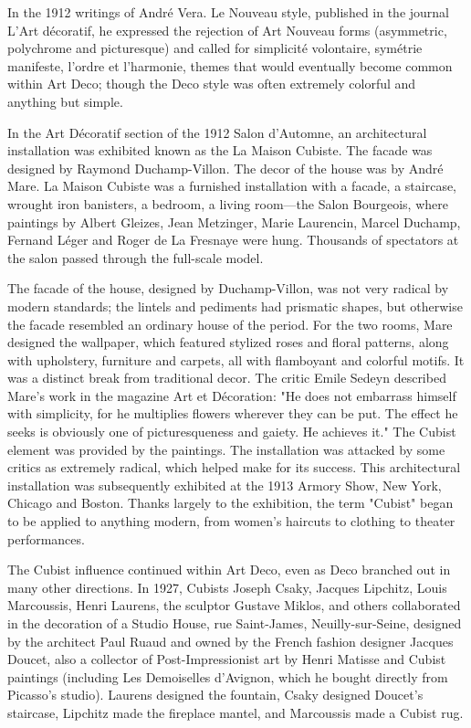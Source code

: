 In the 1912 writings of André Vera. Le Nouveau style, published in the
journal L'Art décoratif, he expressed the rejection of Art Nouveau forms
(asymmetric, polychrome and picturesque) and called for simplicité
volontaire, symétrie manifeste, l'ordre et l'harmonie, themes that would
eventually become common within Art Deco; though the Deco style was
often extremely colorful and anything but simple.

In the Art Décoratif section of the 1912 Salon d'Automne, an
architectural installation was exhibited known as the La Maison Cubiste.
The facade was designed by Raymond Duchamp-Villon. The decor of the
house was by André Mare. La Maison Cubiste was a furnished installation
with a facade, a staircase, wrought iron banisters, a bedroom, a living
room---the Salon Bourgeois, where paintings by Albert Gleizes, Jean
Metzinger, Marie Laurencin, Marcel Duchamp, Fernand Léger and Roger de
La Fresnaye were hung. Thousands of spectators at the salon passed
through the full-scale model.

The facade of the house, designed by Duchamp-Villon, was not very
radical by modern standards; the lintels and pediments had prismatic
shapes, but otherwise the facade resembled an ordinary house of the
period. For the two rooms, Mare designed the wallpaper, which featured
stylized roses and floral patterns, along with upholstery, furniture and
carpets, all with flamboyant and colorful motifs. It was a distinct
break from traditional decor. The critic Emile Sedeyn described Mare's
work in the magazine Art et Décoration: "He does not embarrass himself
with simplicity, for he multiplies flowers wherever they can be put. The
effect he seeks is obviously one of picturesqueness and gaiety. He
achieves it." The Cubist element was provided by the paintings. The
installation was attacked by some critics as extremely radical, which
helped make for its success. This architectural installation was
subsequently exhibited at the 1913 Armory Show, New York, Chicago and
Boston. Thanks largely to the exhibition, the term "Cubist" began to be
applied to anything modern, from women's haircuts to clothing to theater
performances.

The Cubist influence continued within Art Deco, even as Deco branched
out in many other directions. In 1927, Cubists Joseph Csaky, Jacques
Lipchitz, Louis Marcoussis, Henri Laurens, the sculptor Gustave Miklos,
and others collaborated in the decoration of a Studio House, rue
Saint-James, Neuilly-sur-Seine, designed by the architect Paul Ruaud and
owned by the French fashion designer Jacques Doucet, also a collector of
Post-Impressionist art by Henri Matisse and Cubist paintings (including
Les Demoiselles d'Avignon, which he bought directly from Picasso's
studio). Laurens designed the fountain, Csaky designed Doucet's
staircase, Lipchitz made the fireplace mantel, and Marcoussis made a
Cubist rug.

